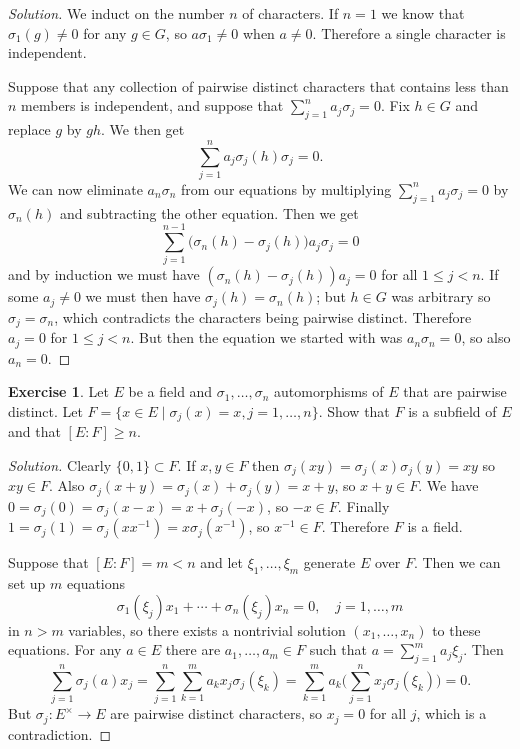 \documentclass[11pt]{amsart}
\theoremstyle{definition}
\newtheorem{e}[theo]{Exercise}
\newenvironment{s}{\begin{proof}[Solution]}{\end{proof}}
\begin{document}
\begin{s}
We induct on the number $n$ of characters.
If $n = 1$ we know that $\sigma_1(g) \not= 0$ for any $g \in G$, so $a \sigma_1 \not= 0$ when $a \not= 0$.
Therefore a single character is independent.

Suppose that any collection of pairwise distinct characters that contains less than $n$ members is independent, and suppose that $\sum_{j=1}^n a_j \sigma_j = 0$.
Fix $h \in G$ and replace $g$ by $gh$.
We then get
\[
\sum_{j=1}^n a_j \sigma_j(h)\sigma_j = 0.
\]
We can now eliminate $a_n \sigma_n$ from our equations by multiplying $\sum_{j=1}^n a_j \sigma_j = 0$ by $\sigma_n(h)$ and subtracting the other equation.
Then we get
\[
\sum_{j=1}^{n-1} \bigl(\sigma_n(h) - \sigma_j(h)\bigr) a_j \sigma_j = 0
\]
and by induction we must have $(\sigma_n(h) - \sigma_j(h)) a_j = 0$ for all $1 \leq j < n$.
If some $a_j \not= 0$ we must then have $\sigma_j(h) = \sigma_n(h)$; but $h \in G$ was arbitrary so $\sigma_j = \sigma_n$, which contradicts the characters being pairwise distinct.
Therefore $a_j = 0$ for $1 \leq j < n$.
But then the equation we started with was $a_n \sigma_n = 0$, so also $a_n = 0$.
\end{s}



\begin{e}
Let $E$ be a field and $\sigma_1, \ldots, \sigma_n$ automorphisms of $E$ that are pairwise distinct.
Let $F = \{x \in E \mid \sigma_j(x) = x, j=1,\ldots,n\}$.
Show that $F$ is a subfield of $E$ and that $[E:F] \geq n$.
\end{e}

\begin{s}
Clearly $\{0,1\} \subset F$.
If $x,y \in F$ then $\sigma_j(xy) = \sigma_j(x) \sigma_j(y) = xy$ so $xy \in F$.
Also $\sigma_j(x+y) = \sigma_j(x) + \sigma_j(y) = x+y$, so $x+y \in F$.
We have $0 = \sigma_j(0) = \sigma_j(x - x) = x + \sigma_j(-x)$, so $-x \in F$.
Finally $1 = \sigma_j(1) = \sigma_j(x x^{-1}) = x \sigma_j(x^{-1})$, so $x^{-1} \in F$.
Therefore $F$ is a field.

Suppose that $[E:F] = m < n$ and let $\xi_1, \ldots, \xi_m$ generate $E$ over $F$.
Then we can set up $m$ equations
\[
\sigma_1(\xi_j) x_1 + \cdots + \sigma_n(\xi_j) x_n = 0,
\quad
j=1,\ldots,m
\]
in $n > m$ variables, so there exists a nontrivial solution $(x_1, \ldots, x_n)$ to these equations.
For any $a \in E$ there are $a_1, \ldots, a_m \in F$ such that $a = \sum_{j=1}^m a_j \xi_j$.
Then
\begin{equation*}
\sum_{j=1}^n \sigma_j(a) x_j
= \sum_{j=1}^n \sum_{k=1}^m a_k x_j \sigma_j(\xi_k)
= \sum_{k=1}^m a_k \biggl( \sum_{j=1}^n x_j \sigma_j(\xi_k) \biggr)
= 0.
\end{equation*}
But $\sigma_j : E^\times \to E$ are pairwise distinct characters, so $x_j = 0$ for all $j$, which is a contradiction.
\end{s}
\end{document}
